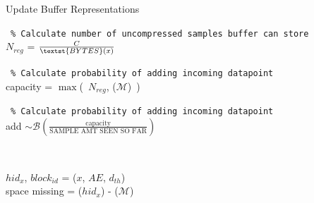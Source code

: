 \documentclass[colorinlistoftodos]{article} %
\begin{document}
\begin{minipage}{\textwidth}
\begin{minipage}{0.45\textwidth}
\begin{algorithm2e}[H]\small
\SetAlgoLined
  \DontPrintSemicolon
    

 \caption{Update Buffer Representations}
\label{algo:vqr}
    
\end{algorithm2e}
\end{minipage}
\qquad
\begin{minipage}{0.5\textwidth}
\begin{algorithm2e}[H]\small
\SetAlgoLined
  \DontPrintSemicolon
    
    \,\,\,\texttt{\% Calculate number of uncompressed samples buffer can store} \\
    $N_{reg}$ = $\frac{C}{\textst{BYTES}(x)}$
    
    \,\,\,\texttt{\% Calculate probability of adding incoming datapoint} \\
    
    capacity = $\max$(\ $N_{reg}$, ($\mathcal{M}$)\ ) 
    
    \,\,\,\texttt{\% Calculate probability of adding incoming datapoint} \\
    add $\sim \mathcal{B}(\frac{\text{capacity}}{\text{SAMPLE AMT SEEN SO FAR}})$
    
    \,\,
    {
        $hid_x$, $block_{id}$ = ($x$, $AE$, $d_{th}$) \\
        space missing =  ($hid_x$) - ($\mathcal{M}$)
        
}
\end{algorithm2e}
\end{minipage}
\end{minipage}
\end{document}
